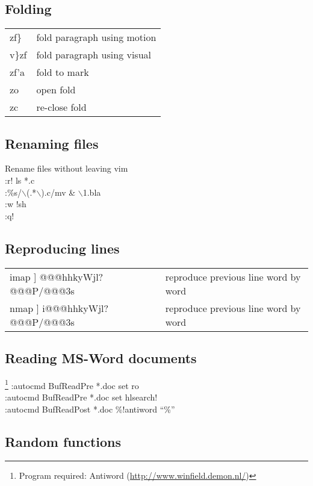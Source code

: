 \documentclass[10pt]{article}
\begin{document}
\subsection{Folding}
\begin{center}
\begin{longtable}{l|l}
 zf\} & fold paragraph using motion\\
 v\}zf & fold paragraph using visual\\
 zf'a & fold to mark\\
 zo & open fold\\
 zc & re-close fold
\end{longtable}
\end{center}

\subsection{Renaming files}
 Rename files without leaving vim\\
 :r! ls *.c\\
 :\%s/$\backslash$(.*$\backslash$).c/mv \& $\backslash$1.bla\\
 :w !sh\\
 :q!

\subsection{Reproducing lines}
\begin{center}
\begin{longtable}{l|l}
 imap ] @@@hhkyWjl?@@@P/@@@3s & reproduce previous line word by word\\
 nmap ] i@@@hhkyWjl?@@@P/@@@3s & reproduce previous line word by word
\end{longtable}
\end{center}

\subsection{Reading MS-Word documents}
\footnote{Program required: Antiword (\url{http://www.winfield.demon.nl/})}
 :autocmd BufReadPre *.doc set ro\\
 :autocmd BufReadPre *.doc set hlsearch!\\
 :autocmd BufReadPost *.doc \%!antiword ``\%''

\subsection{Random functions}
\end{document}

